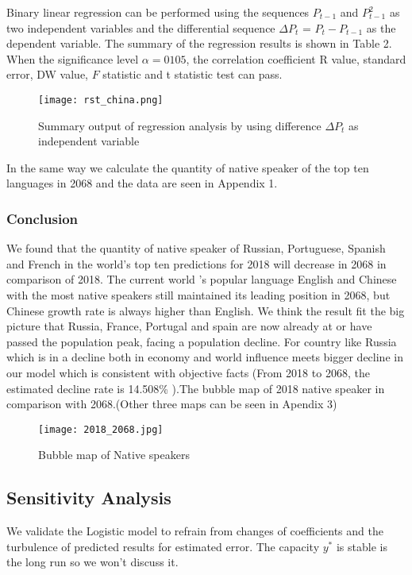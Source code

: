 \documentclass[12pt]{article}  %
\begin{document}
Binary linear regression can be performed using the sequences ${P_{t-1}}$ and ${P_{t-1}^{2}}$ as two independent variables and the differential sequence ${\Delta P_{t}}$ = ${P_{t}-P_{t-1}}$ as the dependent variable. The summary of the regression results is shown in Table 2. When the significance level ${\alpha = 0105}$, the correlation coefficient R value, standard error, DW value, ${F}$ statistic and t statistic test can pass.
\begin{figure}[H]
	\centering
	\texttt{[image: rst\_china.png]}
	\caption{Summary output of regression analysis by using difference ${\Delta P_{t}}$ as independent variable}\label{fig:rst_China}
\end{figure}
In the same way we calculate the quantity of native speaker of the top ten languages in 2068 and the data are seen in Appendix 1.

\subsubsection{Conclusion}
We found that the quantity of native speaker of Russian, Portuguese, Spanish and French in the world's top ten predictions for 2018 will decrease in 2068 in comparison of 2018. The current world ’s popular language English and Chinese with the most native speakers still maintained its leading position in 2068, but Chinese growth rate is always higher than English. We think the result fit the big picture that Russia, France, Portugal and spain are now already at or have passed the population peak, facing a population decline. For country like Russia which is in a decline both in economy and world influence meets bigger decline in our model which is consistent with objective facts (From 2018 to 2068, the estimated decline rate is 14.508\% ).The bubble map of 2018 native speaker in comparison with 2068.(Other three maps can be seen in Apendix 3)
\begin{figure}[H]
	\centering
	\texttt{[image: 2018\_2068.jpg]}
	\caption{Bubble map of Native speakers}\label{fig:2018_2068}
\end{figure}

\subsection{Sensitivity Analysis}
We validate the Logistic model to refrain from changes of coefficients and the turbulence of predicted results for estimated error. The capacity ${y^{*}}$ is stable is the long run so we won’t discuss it.
\end{document}
